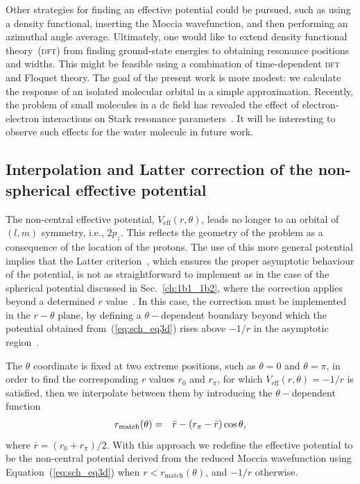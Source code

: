 Other strategies for finding an effective potential could be pursued,
such as using a density functional, inserting the Moccia wavefunction,
and then performing an azimuthal angle average. Ultimately, one would
like to extend density functional theory~(\textsc{dft}) from finding
ground-state energies to obtaining resonance positions and
widths. This might be feasible using a combination of time-dependent
\textsc{dft} and Floquet theory. The goal of the present work is more
modest: we calculate the response of an isolated molecular orbital in
a simple approximation. Recently, the problem of small molecules in a
dc field has revealed the effect of electron-electron interactions on
Stark resonance parameters~\cite{ScrinziJPhysB_ECS}. It will be
interesting to observe such effects for the water molecule in future
work.


\subsection{Interpolation and Latter correction of the
  non-spherical effective potential}
\label{ch:3a1_Latter}

The non-central effective potential, $V_{\mathrm{eff}}(r,\theta)$,
leads no longer to an orbital of $(l,m)$ symmetry, i.e.,
$2p_{z}$. This reflects the geometry of the problem as a consequence
of the location of the protons. The use of this more general potential
implies that the Latter criterion~\cite{LatterCor_1955}, which ensures
the proper asymptotic behaviour of the potential, is not as
straightforward to implement as in the case of the spherical potential
discussed in Sec.~\ref{ch:1b1_1b2}, where the correction applies
beyond a determined $r$ value~\cite{sarias_2016}. In this case, the
correction must be implemented in the $r-\theta$ plane, by defining a
$\theta-$dependent boundary beyond which the potential obtained
from~(\ref{eq:sch_eq3d}) rises above $-1/r$ in the asymptotic
region~\cite{sarias_2017}.

The $\theta$ coordinate is fixed at two extreme positions, such as
$\theta = 0$ and $\theta = \pi$, in order to find the corresponding
$r$ values $r_{0}$ and $r_{\pi}$, for which
$V_{\mathrm{eff}}(r,\theta) = -1/r$ is satisfied, then we interpolate
between them by introducing the $\theta-$dependent function
%
\begin{eqnarray}
r_{\rm{match}}(\theta) & = & \bar{r} - (r_{\pi} - \bar{r}) \cos\theta,
\label{eq:rMatch}
\end{eqnarray}
%
where $\bar{r} = (r_{0} + r_{\pi})/2$. With this approach we redefine
the effective potential to be the non-central potential derived from
the reduced Moccia wavefunction using Equation~(\ref{eq:sch_eq3d})
when $r < r_{\mathrm{match}}(\theta)$, and $-1/r$ otherwise.


